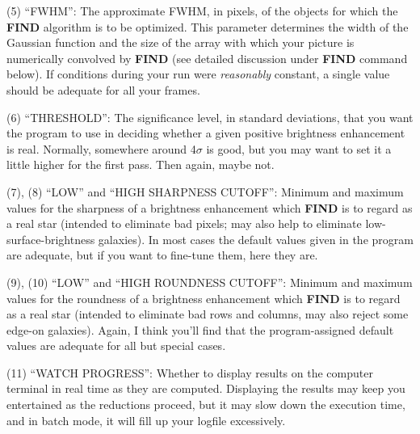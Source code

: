 \item{(5)}  ``FWHM'':  The approximate FWHM, in pixels, of the objects
for which the {\bf FIND} algorithm is to be optimized.  This parameter
determines the width of the Gaussian function and the size of the array
with which your picture is numerically convolved by {\bf FIND} (see
detailed discussion under {\bf FIND} command below).  If conditions
during your run were {\it reasonably\/} constant, a single value should
be adequate for all your frames.

\item{(6)}  ``THRESHOLD'':  The significance level, in standard
deviations, that you want the program to use in deciding whether a
given positive brightness enhancement is real.  Normally, somewhere
around 4$\sigma$ is good, but you may want to set it a little higher
for the first pass.  Then again, maybe not.

\item{(7), (8)}  ``LOW'' and ``HIGH SHARPNESS CUTOFF'':  Minimum and
maximum values for the sharpness of a brightness enhancement which {\bf
FIND} is to regard as a real star (intended to eliminate bad pixels;
may also help to eliminate low-surface-brightness galaxies). In most
cases the default values given in the program are adequate, but if you
want to fine-tune them, here they are.

\item{(9), (10)}  ``LOW'' and ``HIGH ROUNDNESS CUTOFF'':  Minimum and
maximum values for the roundness of a brightness enhancement which {\bf
FIND} is to regard as a real star (intended to eliminate bad rows and
columns, may also reject some edge-on galaxies). Again, I think you'll
find that the program-assigned default values are adequate for all but
special cases.

\item{(11)}  ``WATCH PROGRESS'':  Whether to display results on the
computer terminal in real time as they are computed.  Displaying the
results may keep you entertained as the reductions proceed, but it may
slow down the execution time, and in batch mode, it will fill up your
logfile excessively.


